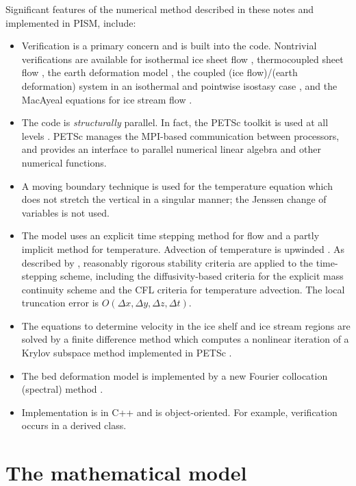 \documentclass[12pt,final]{amsart}%
\theoremstyle{plain}
\theoremstyle{definition}
\theoremstyle{remark}
\begin{document}
Significant features of the numerical method described in these notes and implemented in PISM, include:\begin{itemize}
\item Verification \citep{Roache} is a primary concern and is built into the code.  Nontrivial verifications are available for isothermal ice sheet flow \citep{BLKCB}, thermocoupled sheet flow \citep{BB,BBL}, the earth deformation model \citep{BLKfastearth}, the coupled (ice flow)/(earth deformation) system in an isothermal and pointwise isostasy  case \citep{BLKfastearth}, and the MacAyeal equations for ice stream flow \citep{BrownPresentation}.
\item The code is \emph{structurally} parallel.  In fact, the PETSc toolkit is used at all levels \citep{petsc-web-page,petsc-user-ref}.  PETSc manages the MPI-based communication between processors, and provides an interface to parallel numerical linear algebra and other numerical functions.
\item A moving boundary technique is used for the temperature equation which does not stretch the vertical in a singular manner; the Jenssen \citep{Jenssen} change of variables is not used.
\item The model uses an explicit time stepping method for flow and a partly implicit method for temperature.  Advection of temperature is upwinded \citep{MortonMayers}.  As described by  \citet{BBL}, reasonably rigorous stability criteria are applied to the time-stepping scheme, including the diffusivity-based criteria for the explicit mass continuity scheme and the CFL criteria \citep{MortonMayers} for temperature advection.  The local truncation error is $O(\Delta x,\Delta y,\Delta z,\Delta t)$.
\item The equations to determine velocity in the ice shelf and ice stream regions are solved by a finite difference method which computes a nonlinear iteration of a Krylov subspace method implemented in PETSc \citep{BrownPresentation,petsc-web-page,petsc-user-ref}.
\item The bed deformation model is implemented by a new Fourier collocation (spectral) method \citep{BLKfastearth}.
\item Implementation is in C++ and is object-oriented.  For example, verification occurs in a derived class.
\end{itemize}


\newpage
\section{The mathematical model}
\label{mathmodelsect}
\end{document}
